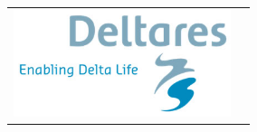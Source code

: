 \begin{table}
\begin{tabular}{cc}
        \includegraphics[width = 2.5in]{figures/deltareslogo.jpg}\\
    \end{tabular}
\end{table}
